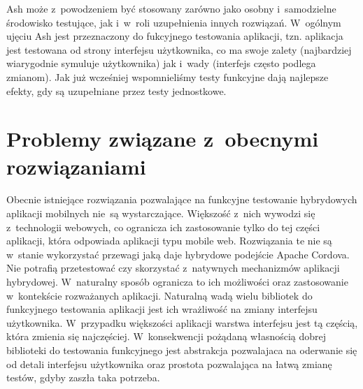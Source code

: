 \documentclass[brudnopis]{xmgr}
\begin{document}
Ash może z~powodzeniem być stosowany zarówno jako osobny i~samodzielne środowisko testujące, jak i~w~roli uzupełnienia innych rozwiązań. W~ogólnym ujęciu Ash jest przeznaczony do fukcyjnego testowania aplikacji, tzn. aplikacja jest testowana od strony interfejsu użytkownika, co ma swoje zalety (najbardziej wiarygodnie symuluje użytkownika) jak i~wady (interfejs często podlega zmianom). Jak już wcześniej wspomnieliśmy testy funkcyjne dają najlepsze efekty, gdy są uzupełniane przez testy jednostkowe.  

\section{Problemy związane z~obecnymi rozwiązaniami}

Obecnie istniejące rozwiązania pozwalające na funkcyjne testowanie hybrydowych aplikacji mobilnych nie~są wystarczające. Większość z~nich wywodzi się z~technologii webowych, co ogranicza ich zastosowanie tylko do tej części aplikacji, która odpowiada aplikacji typu mobile web. Rozwiązania te nie są w~stanie wykorzystać przewagi jaką daje hybrydowe podejście Apache Cordova. Nie potrafią przetestować czy skorzystać z~natywnych mechanizmów aplikacji hybrydowej. W~naturalny sposób ogranicza to ich możliwości oraz zastosowanie w~kontekście rozważanych aplikacji. Naturalną wadą wielu bibliotek do funkcyjnego testowania aplikacji jest ich wrażliwość na zmiany interfejsu użytkownika. W~przypadku większości aplikacji warstwa interfejsu jest tą częścią, która zmienia się najczęściej. W~konsekwencji pożądaną własnością dobrej biblioteki do testowania funkcyjnego jest abstrakcja pozwalajaca na oderwanie się od detali interfejsu użytkownika oraz prostota pozwalająca na łatwą zmianę testów, gdyby zaszła taka potrzeba. 
\end{document}
